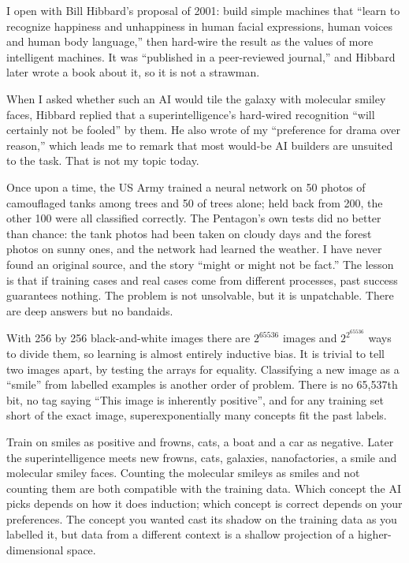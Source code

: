 
I open with Bill Hibbard's proposal of 2001: build simple machines that ``learn to recognize happiness and unhappiness in human facial expressions, human voices and human body language,'' then hard-wire the result as the values of more intelligent machines. It was ``published in a peer-reviewed journal,'' and Hibbard later wrote a book about it, so it is not a strawman. 

When I asked whether such an AI would tile the galaxy with molecular smiley faces, Hibbard replied that a superintelligence's hard-wired recognition ``will certainly not be fooled'' by them. He also wrote of my ``preference for drama over reason,'' which leads me to remark that most would-be AI builders are unsuited to the task. That is not my topic today.

Once upon a time, the US Army trained a neural network on 50 photos of camouflaged tanks among trees and 50 of trees alone; held back from 200, the other 100 were all classified correctly. The Pentagon's own tests did no better than chance: the tank photos had been taken on cloudy days and the forest photos on sunny ones, and the network had learned the weather. I have never found an original source, and the story ``might or might not be fact.''  The lesson is that if training cases and real cases come from different processes, past success guarantees nothing. The problem is not unsolvable, but it is unpatchable. There are deep answers but no bandaids.

With 256 by 256 black-and-white images there are $2^{65536}$ images and $2^{2^{65536}}$ ways to divide them, so learning is almost entirely inductive bias. It is trivial to tell two images apart, by testing the arrays for equality. Classifying a new image as a ``smile'' from labelled examples is another order of problem. There is no 65,537th bit, no tag saying ``This image is inherently positive'', and for any training set short of the exact image, superexponentially many concepts fit the past labels.

Train on smiles as positive and frowns, cats, a boat and a car as negative. Later the superintelligence meets new frowns, cats, galaxies, nanofactories, a smile and molecular smiley faces. Counting the molecular smileys as smiles and not counting them are both compatible with the training data. Which concept the AI picks depends on how it does induction; which concept is correct depends on your preferences. The concept you wanted cast its shadow on the training data as you labelled it, but data from a different context is a shallow projection of a higher-dimensional space.


